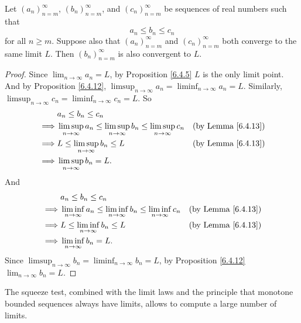 \begin{corollary}\label{6.4.14}
    Let \((a_n)_{n = m}^\infty\), \((b_n)_{n = m}^\infty\), and \((c_n)_{n = m}^\infty\) be sequences of real numbers such that
    \[
        a_n \leq b_n \leq c_n
    \]
    for all \(n \geq m\).
    Suppose also that \((a_n)_{n = m}^\infty\) and \((c_n)_{n = m}^\infty\) both converge to the same limit \(L\).
    Then \((b_n)_{n = m}^\infty\) is also convergent to \(L\).
\end{corollary}

\begin{proof}
    Since \(\lim_{n \to \infty} a_n = L\), by Proposition \ref{6.4.5} \(L\) is the only limit point.
    And by Proposition \ref{6.4.12}, \(\limsup_{n \to \infty} a_n = \liminf_{n \to \infty} a_n = L\).
    Similarly, \(\limsup_{n \to \infty} c_n = \liminf_{n \to \infty} c_n = L\).
    So
    \begin{align*}
                 & a_n \leq b_n \leq c_n                                                                                                       \\
        \implies & \limsup_{n \to \infty} a_n \leq \limsup_{n \to \infty} b_n \leq \limsup_{n \to \infty} c_n & \text{(by Lemma \ref{6.4.13})} \\
        \implies & L \leq \limsup_{n \to \infty} b_n \leq L                                                   & \text{(by Lemma \ref{6.4.13})} \\
        \implies & \limsup_{n \to \infty} b_n = L.
    \end{align*}
    And
    \begin{align*}
                 & a_n \leq b_n \leq c_n                                                                                                       \\
        \implies & \liminf_{n \to \infty} a_n \leq \liminf_{n \to \infty} b_n \leq \liminf_{n \to \infty} c_n & \text{(by Lemma \ref{6.4.13})} \\
        \implies & L \leq \liminf_{n \to \infty} b_n \leq L                                                   & \text{(by Lemma \ref{6.4.13})} \\
        \implies & \liminf_{n \to \infty} b_n = L.
    \end{align*}
    Since \(\limsup_{n \to \infty} b_n = \liminf_{n \to \infty} b_n = L\), by Proposition \ref{6.4.12} \(\lim_{n \to \infty} b_n = L\).
\end{proof}

\setcounter{theorem}{15}
\begin{remark}\label{6.4.16}
    The squeeze test, combined with the limit laws and the principle that monotone bounded sequences always have limits, allows to compute a large number of limits.
\end{remark}

